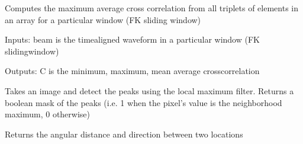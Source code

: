 \documentclass[letterpaper,10pt,english]{sphinxmanual}
\begin{document}

\begin{fulllineitems}
\label{\detokenize{infrapy.detection:infrapy.detection.beamforming.corrpT}}
Computes the maximum average cross correlation from all triplets of elements in an
array for a particular window (FK sliding window)

Inputs:
\sphinxhyphen{} beam is the time\sphinxhyphen{}aligned waveform in a particular window (FK sliding\sphinxhyphen{}window)

Outputs:
\sphinxhyphen{} C is the minimum, maximum, mean average cross\sphinxhyphen{}correlation

\end{fulllineitems}


\begin{fulllineitems}
\label{\detokenize{infrapy.detection:infrapy.detection.beamforming.detect_peaks}}
Takes an image and detect the peaks using the local maximum filter.
Returns a boolean mask of the peaks (i.e. 1 when
the pixel’s value is the neighborhood maximum, 0 otherwise)

\end{fulllineitems}


\begin{fulllineitems}
\label{\detokenize{infrapy.detection:infrapy.detection.beamforming.dist_az}}
Returns the angular distance and direction between two locations

\end{fulllineitems}

\end{document}
